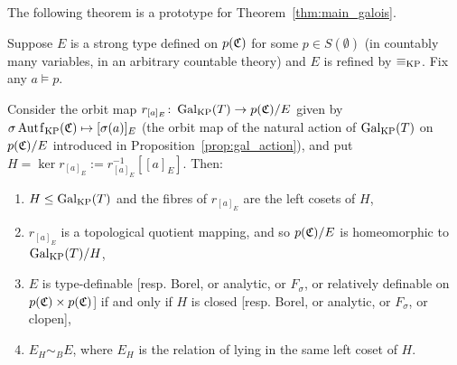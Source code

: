	The following theorem is a prototype for Theorem~\ref{thm:main_galois}.
	\begin{thm}
		\label{thm:main_over_KP}
		Suppose $E$ is a strong type defined on $p({\mathfrak C})$ for some $p\in S(\emptyset)$ (in countably many variables, in an arbitrary countable theory) and $E$ is refined by $\equiv_{\mathrm{KP}}$. Fix any $a\models p$.
		
		Consider the orbit map $r_{[a]_E}\colon \operatorname{{Gal}}_{\mathrm{KP}}(T)\to p({\mathfrak C})/E$ given by $\sigma\Autf_\KP(\fC)\mapsto [\sigma(a)]_E$ (the orbit map of the natural action of $\operatorname{{Gal}}_{\mathrm{KP}}(T)$ on $p({\mathfrak C})/E$ introduced in Proposition~\ref{prop:gal_action}), and put $H=\ker r_{[a]_E}:=r_{[a]_E}^{-1}[[a]_E]$. Then:
		\begin{enumerate}
			\item
			$H\leq \operatorname{{Gal}}_{\mathrm{KP}}(T)$ and the fibres of $r_{[a]_E}$ are the left cosets of $H$,
			\item
			$r_{[a]_E}$ is a topological quotient mapping, and so $p({\mathfrak C})/E$ is homeomorphic to $\operatorname{{Gal}}_{\mathrm{KP}}(T)/H$,
			\item
			$E$ is type-definable [resp. Borel, or analytic, or $F_\sigma$, or relatively definable on $p({\mathfrak C}) \times p({\mathfrak C})$] if and only if $H$ is closed [resp. Borel, or analytic, or $F_\sigma$, or clopen],
			\item
			$E_H\sim_B E$, where $E_H$ is the relation of lying in the same left coset of $H$.
		\end{enumerate}
	\end{thm}
